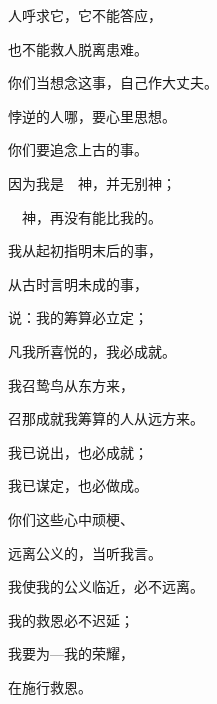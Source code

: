 {\par }{\Q 人呼求它，它不能答应，
\par }{\Q 也不能救人脱离患难。
\par }{\BB \par }{\Q {}你们当想念这事，自己作大丈夫。
\par }{\Q 悖逆的人哪，要心里思想。
\par }{\Q {}你们要追念上古的事。
\par }{\Q 因为我是　神，并无别神；
\par }{　神，再没有能比我的。
\par }{\Q {}我从起初指明末后的事，
\par }{\Q 从古时言明未成的事，
\par }{\Q 说：我的筹算必立定；
\par }{\Q 凡我所喜悦的，我必成就。
\par }{\Q {}我召鸷鸟从东方来，
\par }{\Q 召那成就我筹算的人从远方来。
\par }{\Q 我已说出，也必成就；
\par }{\Q 我已谋定，也必做成。
\par }{\Q {}你们这些心中顽梗、
\par }{\Q 远离公义的，当听我言。
\par }{\Q {}我使我的公义临近，必不远离。
\par }{\Q 我的救恩必不迟延；
\par }{\Q 我要为{}—我的荣耀，
\par }{\Q 在{}施行救恩。

}
